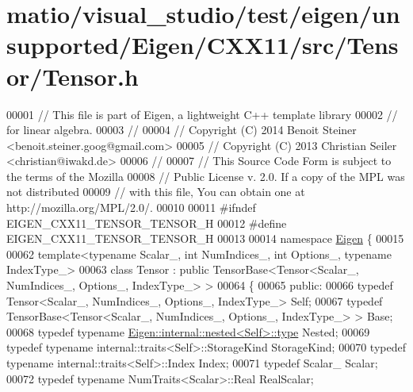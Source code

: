 \hypertarget{matio_2visual__studio_2test_2eigen_2unsupported_2_eigen_2_c_x_x11_2src_2_tensor_2_tensor_8h_source}{}\section{matio/visual\+\_\+studio/test/eigen/unsupported/\+Eigen/\+C\+X\+X11/src/\+Tensor/\+Tensor.h}
\label{matio_2visual__studio_2test_2eigen_2unsupported_2_eigen_2_c_x_x11_2src_2_tensor_2_tensor_8h_source}

\begin{DoxyCode}
00001 \textcolor{comment}{// This file is part of Eigen, a lightweight C++ template library}
00002 \textcolor{comment}{// for linear algebra.}
00003 \textcolor{comment}{//}
00004 \textcolor{comment}{// Copyright (C) 2014 Benoit Steiner <benoit.steiner.goog@gmail.com>}
00005 \textcolor{comment}{// Copyright (C) 2013 Christian Seiler <christian@iwakd.de>}
00006 \textcolor{comment}{//}
00007 \textcolor{comment}{// This Source Code Form is subject to the terms of the Mozilla}
00008 \textcolor{comment}{// Public License v. 2.0. If a copy of the MPL was not distributed}
00009 \textcolor{comment}{// with this file, You can obtain one at http://mozilla.org/MPL/2.0/.}
00010 
00011 \textcolor{preprocessor}{#ifndef EIGEN\_CXX11\_TENSOR\_TENSOR\_H}
00012 \textcolor{preprocessor}{#define EIGEN\_CXX11\_TENSOR\_TENSOR\_H}
00013 
00014 \textcolor{keyword}{namespace }\hyperlink{namespace_eigen}{Eigen} \{
00015 
00062 \textcolor{keyword}{template}<\textcolor{keyword}{typename} Scalar\_, \textcolor{keywordtype}{int} NumIndices\_, \textcolor{keywordtype}{int} Options\_, \textcolor{keyword}{typename} IndexType\_>
00063 \textcolor{keyword}{class }Tensor : \textcolor{keyword}{public} TensorBase<Tensor<Scalar\_, NumIndices\_, Options\_, IndexType\_> >
00064 \{
00065   \textcolor{keyword}{public}:
00066     \textcolor{keyword}{typedef} Tensor<Scalar\_, NumIndices\_, Options\_, IndexType\_> Self;
00067     \textcolor{keyword}{typedef} TensorBase<Tensor<Scalar\_, NumIndices\_, Options\_, IndexType\_> > Base;
00068     \textcolor{keyword}{typedef} \textcolor{keyword}{typename} \hyperlink{class_eigen_1_1internal_1_1_tensor_lazy_evaluator_writable}{Eigen::internal::nested<Self>::type} Nested;
00069     \textcolor{keyword}{typedef} \textcolor{keyword}{typename} internal::traits<Self>::StorageKind StorageKind;
00070     \textcolor{keyword}{typedef} \textcolor{keyword}{typename} internal::traits<Self>::Index Index;
00071     \textcolor{keyword}{typedef} Scalar\_ Scalar;
00072     \textcolor{keyword}{typedef} \textcolor{keyword}{typename} NumTraits<Scalar>::Real RealScalar;

\end{DoxyCode}
